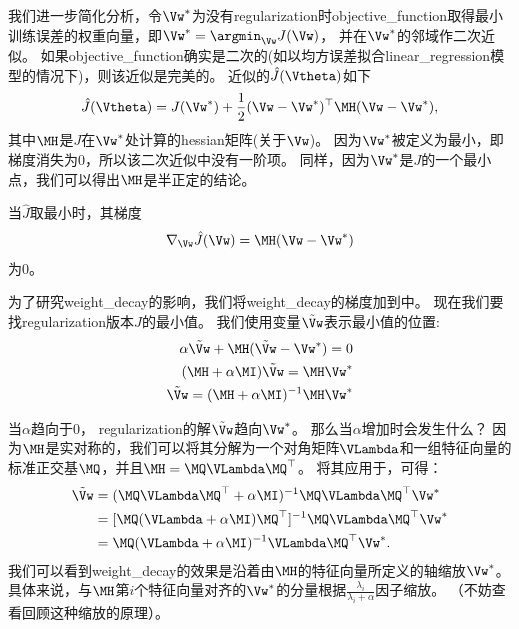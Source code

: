 我们进一步简化分析，令$\Vw^*$为没有\gls{regularization}时\gls{objective_function}取得最小训练误差的权重向量，即$\Vw^* = \argmin_{\Vw} J(\Vw)$， 并在$\Vw^*$的邻域作二次近似。
如果\gls{objective_function}确实是二次的(如以均方误差拟合\gls{linear_regression}模型的情况下)，则该近似是完美的。
近似的$\hat J(\Vtheta)$如下
\begin{align}
 \hat J(\Vtheta) = J(\Vw^*) + \frac{1}{2}(\Vw - \Vw^*)^\top \MH (\Vw - \Vw^*),
\end{align}
其中$\MH$是$J$在$\Vw^*$处计算的\gls{hessian}矩阵(关于$\Vw$)。
因为$\Vw^*$被定义为最小，即梯度消失为0，所以该二次近似中没有一阶项。
同样，因为$\Vw^*$是$J$的一个最小点，我们可以得出$\MH$是半正定的结论。

当$\hat J$取最小时，其梯度
\begin{align}
\label{eq:gradient}
  \nabla_{\Vw} \hat{J}(\Vw) = \MH (\Vw - \Vw^*)
\end{align}
为0。

为了研究\gls{weight_decay}的影响，我们将\gls{weight_decay}的梯度加到中。 
现在我们要找\gls{regularization}版本$\hat J$的最小值。
我们使用变量$\tilde{\Vw}$表示最小值的位置:
\begin{align}
 \alpha \tilde{\Vw} + \MH (\tilde{\Vw} - \Vw^*) = 0 \\
 (\MH + \alpha \MI) \tilde{\Vw} = \MH \Vw^* \\
 \tilde{\Vw} = (\MH + \alpha \MI)^{-1} \MH \Vw^* \label{eq:final_w}
 \end{align}

当$\alpha$趋向于0， \gls{regularization}的解$\tilde{\Vw}$趋向$\Vw^*$。 
那么当$\alpha$增加时会发生什么？
因为$\MH$是实对称的，我们可以将其分解为一个对角矩阵$\VLambda$和一组特征向量的标准正交基$\MQ$，并且$\MH = \MQ \VLambda \MQ^\top$。
将其应用于，可得：
\begin{align}
 \tilde \Vw &= ( \MQ \VLambda \MQ^\top + \alpha \MI)^{-1} \MQ \VLambda \MQ^\top \Vw^* \\
                 &=  [ \MQ( \VLambda+ \alpha \MI)  \MQ^\top ]^{-1} \MQ \VLambda \MQ^\top \Vw^* \\
                 &= \MQ( \VLambda+ \alpha \MI)^{-1} \VLambda \MQ^\top \Vw^*. \label{eq:713L2}
\end{align}
我们可以看到\gls{weight_decay}的效果是沿着由$\MH$的特征向量所定义的轴缩放$\Vw^*$。
具体来说，与$\MH$第$i$个特征向量对齐的$\Vw^*$的分量根据$\frac{\lambda_i}{\lambda_i + \alpha}$因子缩放。
（不妨查看回顾这种缩放的原理）。

